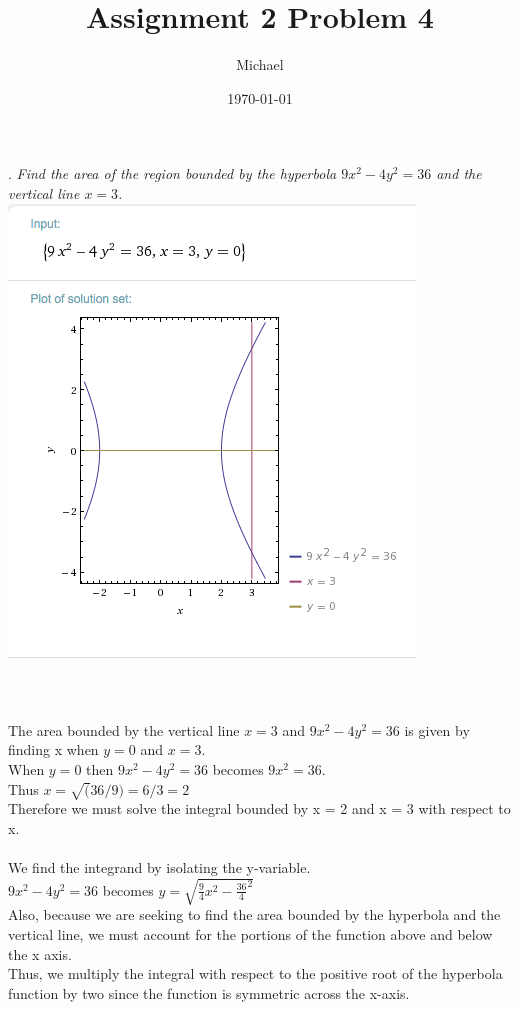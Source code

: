\documentclass[11pt, oneside]{article}   	%
\title{Assignment 2 Problem 4}
\author{Michael}
\date{\today}							%
\begin{document}
\maketitle

. \textit{Find the area of the region bounded by the hyperbola $9x^2 - 4y^2 = 36$ and the vertical line $x = 3$.}\\

\includegraphics[width=.70\textwidth]{prob4_plot.png}\\~\\~\\~\\
The area bounded by the vertical line $x=3$ and $9x^2 - 4y^2 = 36$ is given by finding x when $y = 0$ and $x=3$.\\
When $y=0$ then $9x^2 - 4y^2 = 36$ becomes $9x^2 = 36$. \\
Thus $x = \sqrt(36/9) = 6/3 = 2$\\
Therefore we must solve the integral bounded by x = 2 and x = 3 with respect to x.\\~\\
We find the integrand by isolating the y-variable.\\
$9x^2 - 4y^2 = 36$ becomes $y = \sqrt{\frac{9}{4}x^2 - \frac{36}{4}^2}$\\
Also, because we are seeking to find the area bounded by the hyperbola and the vertical line, we must account for the portions of the function above and below the x axis.\\
Thus, we multiply the integral with respect to the positive root of the hyperbola function by two since the function is symmetric across the x-axis.\\~\\
\end{document}
